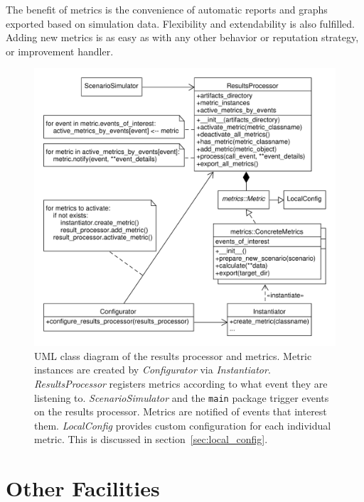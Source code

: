 \documentclass[%
    ]{\PathToTumTemplate/thesis/tum_thesis}
\begin{document}
The benefit of metrics is the convenience of automatic reports and graphs exported based on simulation data.
Flexibility and extendability is also fulfilled.
Adding new metrics is as easy as with any other behavior or reputation strategy, or improvement handler.

\begin{figure}[tbp]
  \begin{center}
        \includegraphics[width=1\linewidth]	{../uml/reproc_metrics.pdf}
    \caption{
	UML class diagram of the results processor and metrics.
	Metric instances are created by \emph{Configurator} via \emph{Instantiator}.
	\emph{ResultsProcessor} registers metrics according to what event they are listening to.
	\emph{ScenarioSimulator} and the \lstinline{main} package trigger events on the results processor.
	Metrics are notified of events that interest them.
	\emph{LocalConfig} provides custom configuration for each individual metric.
	This is discussed in section~\ref{sec:local_config}.
    }
    \label{fig:reproc_metrics}
  \end{center}
\end{figure}



\section{Other Facilities}\label{sec:impl_misc}
\end{document}
